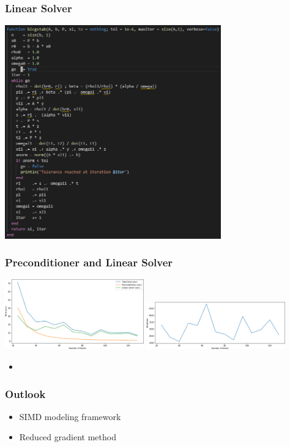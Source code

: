 \begin{frame}[fragile]
  \frametitle{Linear Solver}
  \begin{center}
   \includegraphics[width=0.7\textwidth]{figures/bicgstab.png}
  \end{center}
\end{frame}

\begin{frame}
  \frametitle{Preconditioner and Linear Solver}
  \begin{center}
   \includegraphics[width=0.45\textwidth]{figures/blocks}
   \includegraphics[width=0.45\textwidth]{figures/bicgstabiter}
  \end{center}
  \begin{itemize}
    \item 
  \end{itemize}
\end{frame}

\begin{frame}
  \frametitle{Outlook}
  \begin{itemize}
    \item SIMD modeling framework
    \item Reduced gradient method
  \end{itemize}
\end{frame}



